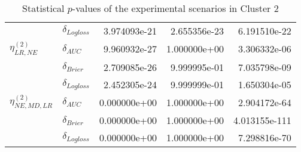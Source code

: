 \begin{table}[!h]
\begin{tabular}{l|lrrr}
                              & $\delta_{Logloss}$ &           3.974093e-21 &     2.655356e-23 &             6.191510e-22 \\
    $\eta^{(2)}_{LR, NE}$ & $\delta_{AUC}$ &           9.960932e-27 &     1.000000e+00 &             3.306332e-06 \\
                              & $\delta_{Brier}$ &           2.709085e-26 &     9.999995e-01 &             7.035798e-09 \\
                              & $\delta_{Logloss}$ &           2.452305e-24 &     9.999999e-01 &             1.650304e-05 \\
    $\eta^{(2)}_{NE, MD, LR}$ & $\delta_{AUC}$ &           0.000000e+00 &     1.000000e+00 &             2.904172e-64 \\
                              & $\delta_{Brier}$ &           0.000000e+00 &     1.000000e+00 &            4.013155e-111 \\
                              & $\delta_{Logloss}$ &           0.000000e+00 &     1.000000e+00 &             7.298816e-70 \\
    \bottomrule
    \end{tabular}
    \caption{Statistical $p$-values of the experimental scenarios in Cluster 2}
    \end{table}
    
